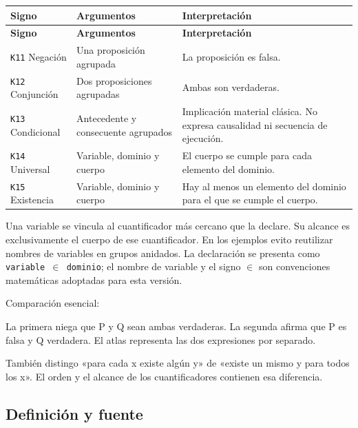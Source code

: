 \begingroup\small
\begin{longtable}{@{}>{\raggedright\arraybackslash}p{}>{\raggedright\arraybackslash}p{}>{\raggedright\arraybackslash}p{}@{}}
\toprule
\textbf{Signo} & \textbf{Argumentos} & \textbf{Interpretación} \\ \midrule
\endfirsthead
\toprule
\textbf{Signo} & \textbf{Argumentos} & \textbf{Interpretación} \\ \midrule
\endhead
\bottomrule\endfoot
\texttt{K11} Negación & Una proposición agrupada & La proposición es falsa. \\[4pt]
\texttt{K12} Conjunción & Dos proposiciones agrupadas & Ambas son verdaderas. \\[4pt]
\texttt{K13} Condicional & Antecedente y consecuente agrupados & Implicación material clásica. No expresa causalidad ni secuencia de ejecución. \\[4pt]
\texttt{K14} Universal & Variable, dominio y cuerpo & El cuerpo se cumple para cada elemento del dominio. \\[4pt]
\texttt{K15} Existencia & Variable, dominio y cuerpo & Hay al menos un elemento del dominio para el que se cumple el cuerpo. \\[4pt]
\end{longtable}
\endgroup

Una variable se vincula al cuantificador más cercano que la declare. Su alcance es exclusivamente el cuerpo de ese cuantificador. En los ejemplos evito reutilizar nombres de variables en grupos anidados. La declaración se presenta como \texttt{variable \ensuremath{\in} dominio}; el nombre de variable y el signo \ensuremath{\in} son convenciones matemáticas adoptadas para esta versión.

Comparación esencial:


La primera niega que P y Q sean ambas verdaderas. La segunda afirma que P es falsa y Q verdadera. El atlas representa las dos expresiones por separado.

También distingo «para cada x existe algún y» de «existe un mismo y para todos los x». El orden y el alcance de los cuantificadores contienen esa diferencia.

\subsection{Definición y fuente}


